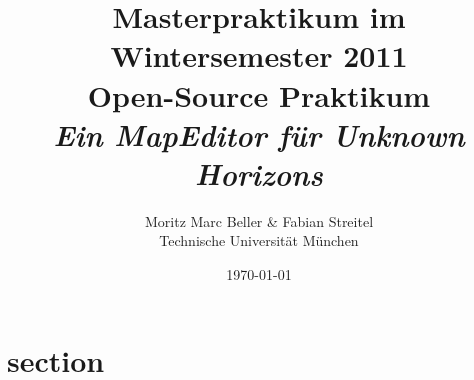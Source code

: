 \documentclass[german]{article}
\author{Moritz Marc Beller \& Fabian Streitel \\ Technische Universität München}
\title{Masterpraktikum im Wintersemester 2011 \\
Open-Source Praktikum \\
\textit{Ein MapEditor für Unknown Horizons}}
\date{\today} %
\begin{document}
\maketitle{}

\begin{abstract}

\end{abstract}

\section{section}


{}
\end{document}
